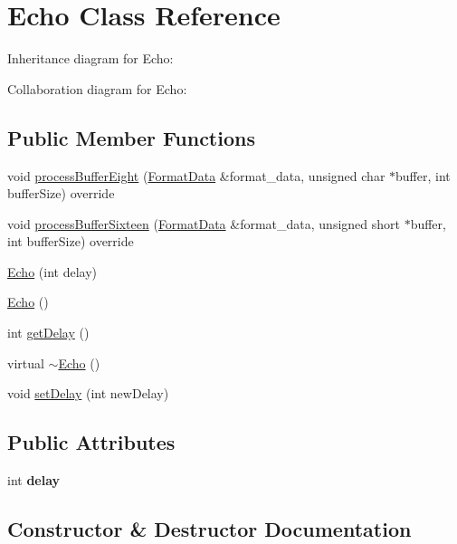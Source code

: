 \hypertarget{classEcho}{}\section{Echo Class Reference}
\label{classEcho}


Inheritance diagram for Echo\+:


Collaboration diagram for Echo\+:
\subsection*{Public Member Functions}
\begin{DoxyCompactItemize}
\item 
void \hyperlink{classEcho_abe45c85f9a1206ccc6f17e329f831b50}{process\+Buffer\+Eight} (\hyperlink{structFormatData}{Format\+Data} \&format\+\_\+data, unsigned char $\ast$buffer, int buffer\+Size) override
\item 
void \hyperlink{classEcho_adc142cd667b7ada7e538cfdf7039c96d}{process\+Buffer\+Sixteen} (\hyperlink{structFormatData}{Format\+Data} \&format\+\_\+data, unsigned short $\ast$buffer, int buffer\+Size) override
\item 
\hyperlink{classEcho_a9531515ffab8be1e38cbdc0e0e9338a6}{Echo} (int delay)
\item 
\hyperlink{classEcho_ababd42898feed0775f5234d53fe9bff1}{Echo} ()
\item 
int \hyperlink{classEcho_a57e19c9232f9bb96ccd78ba4bb68d6c9}{get\+Delay} ()
\item 
virtual \hyperlink{classEcho_a03c51e9ff426744f7ae68a9aac8614c8}{$\sim$\+Echo} ()
\item 
void \hyperlink{classEcho_a3096c57223d6f7ce3097d15e8bf4a0ed}{set\+Delay} (int new\+Delay)
\end{DoxyCompactItemize}
\subsection*{Public Attributes}
\begin{DoxyCompactItemize}
\item 
\mbox{\label{classEcho_abf5c35aa942bfae1832de23bb261e444}} 
int {\bfseries delay}
\end{DoxyCompactItemize}


\subsection{Constructor \& Destructor Documentation}
\mbox{\label{classEcho_a9531515ffab8be1e38cbdc0e0e9338a6}} 
